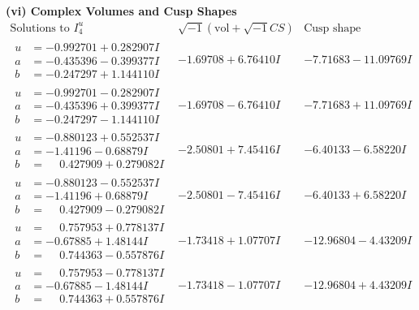 \documentclass[1p]{elsarticle_modified}
\theoremstyle{definition}
\newcommand{\I}{\sqrt{-1}}
\begin{document}
\newpage\flushleft \textbf{(vi) Complex Volumes and Cusp Shapes}
$$\begin{array}{c|c|c}  
\text{Solutions to }I^u_{4}& \I (\text{vol} + \sqrt{-1}CS) & \text{Cusp shape}\\
 \hline 
\begin{aligned}
u &= -0.992701 + 0.282907 I \\
a &= -0.435396 - 0.399377 I \\
b &= -0.247297 + 1.144110 I\end{aligned}
 & -1.69708 + 6.76410 I & -7.71683 - 11.09769 I \\ \hline\begin{aligned}
u &= -0.992701 - 0.282907 I \\
a &= -0.435396 + 0.399377 I \\
b &= -0.247297 - 1.144110 I\end{aligned}
 & -1.69708 - 6.76410 I & -7.71683 + 11.09769 I \\ \hline\begin{aligned}
u &= -0.880123 + 0.552537 I \\
a &= -1.41196 - 0.68879 I \\
b &= \phantom{-}0.427909 + 0.279082 I\end{aligned}
 & -2.50801 + 7.45416 I & -6.40133 - 6.58220 I \\ \hline\begin{aligned}
u &= -0.880123 - 0.552537 I \\
a &= -1.41196 + 0.68879 I \\
b &= \phantom{-}0.427909 - 0.279082 I\end{aligned}
 & -2.50801 - 7.45416 I & -6.40133 + 6.58220 I \\ \hline\begin{aligned}
u &= \phantom{-}0.757953 + 0.778137 I \\
a &= -0.67885 + 1.48144 I \\
b &= \phantom{-}0.744363 - 0.557876 I\end{aligned}
 & -1.73418 + 1.07707 I & -12.96804 - 4.43209 I \\ \hline\begin{aligned}
u &= \phantom{-}0.757953 - 0.778137 I \\
a &= -0.67885 - 1.48144 I \\
b &= \phantom{-}0.744363 + 0.557876 I\end{aligned}
 & -1.73418 - 1.07707 I & -12.96804 + 4.43209 I \\ \hline\begin{aligned}

\end{aligned}
\end{array}$$
\end{document}
